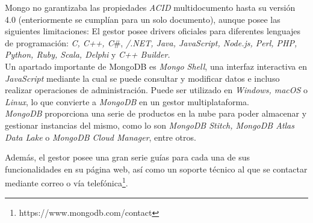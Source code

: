 \documentclass[11pt,a4paper]{article}
\begin{document}
Mongo no garantizaba las propiedades \emph{ACID} multidocumento hasta su versión 4.0 (enteriormente se cumplían para un solo documento), aunque posee las siguientes limitaciones\cite{WIKI:3}: 
El gestor posee drivers oficiales para diferentes lenguajes de programación: \emph{C, C++, C}\#, \emph{/.NET, Java, JavaScript, Node.js, Perl, PHP, Python, Ruby, Scala, Delphi} y \emph{C++ Builder.}\\

Un apartado importante de MongoDB es \emph{Mongo Shell}\cite{MDB:6}, una interfaz interactiva en \emph{JavaScript} mediante la cual se puede consultar y modificar datos e incluso realizar operaciones de administración. Puede ser utilizado en \emph{Windows, macOS} o \emph{Linux}, lo que convierte a \emph{MongoDB} en un gestor multiplataforma.\\

\emph{MongoDB} proporciona una serie de productos en la nube para poder almacenar y gestionar instancias del mismo, como lo son \emph{MongoDB Stitch, MongoDB Atlas Data Lake} o \emph{MongoDB Cloud Manager}, entre otros.\cite{MDB:7}

Además, el gestor posee una gran serie guías para cada una de sus funcionalidades en su página web\cite{MDB:8}, así como un soporte técnico al que se contactar mediante correo o vía telefónica\footnote{https://www.mongodb.com/contact}.





\end{document}
